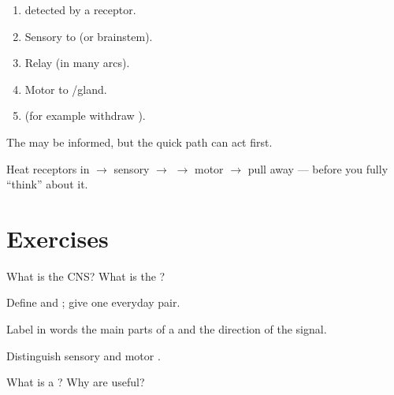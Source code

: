 \begin{method}\label{met:g7:nervous:arc}
\begin{enumerate}
  \item {} detected by a receptor.
  \item Sensory  to  (or brainstem).
  \item Relay  (in many arcs).
  \item Motor  to /gland.
  \item {} (for example withdraw ).
\end{enumerate}
The  may be informed, but the quick path can act first.
\end{method}

\begin{example}\label{ex:g7:nervous:hot}
Heat receptors in  $\to$ sensory  $\to$  $\to$ motor
 $\to$   pull away --- before you fully ``think'' about
it.
\end{example}

\section{Exercises}

\begin{exercise}[$\star$]\label{exo:g7:nervous:1}
What is the CNS? What is the ?
\end{exercise}

\begin{exercise}[$\star$]\label{exo:g7:nervous:2}
Define  and ; give one everyday pair.
\end{exercise}

\begin{exercise}[$\star$]\label{exo:g7:nervous:3}
Label in words the main parts of a  and the direction of the
signal.
\end{exercise}

\begin{exercise}[$\star$]\label{exo:g7:nervous:4}
Distinguish sensory and motor .
\end{exercise}

\begin{exercise}[$\star$]\label{exo:g7:nervous:5}
What is a ? Why are  useful?
\end{exercise}

